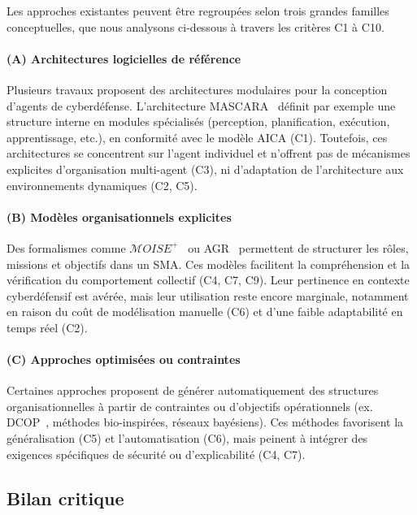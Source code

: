 Les approches existantes peuvent être regroupées selon trois grandes familles conceptuelles, que nous analysons ci-dessous à travers les critères C1 à C10.

\paragraph{(A) Architectures logicielles de référence}

Plusieurs travaux proposent des architectures modulaires pour la conception d'agents de cyberdéfense. L'architecture \ac{MASCARA}~\cite{Kott2023} définit par exemple une structure interne en modules spécialisés (perception, planification, exécution, apprentissage, etc.), en conformité avec le modèle \ac{AICA} (C1). Toutefois, ces architectures se concentrent sur l'agent individuel et n'offrent pas de mécanismes explicites d'organisation multi-agent (C3), ni d'adaptation de l'architecture aux environnements dynamiques (C2, C5).

\paragraph{(B) Modèles organisationnels explicites}

Des formalismes comme $\mathcal{M}OISE^+$~\cite{hubner2002moise} ou \ac{AGR}~\cite{Ferber2004} permettent de structurer les rôles, missions et objectifs dans un \ac{SMA}. Ces modèles facilitent la compréhension et la vérification du comportement collectif (C4, C7, C9). Leur pertinence en contexte cyberdéfensif est avérée, mais leur utilisation reste encore marginale, notamment en raison du coût de modélisation manuelle (C6) et d'une faible adaptabilité en temps réel (C2).

\paragraph{(C) Approches optimisées ou contraintes}

Certaines approches proposent de générer automatiquement des structures organisationnelles à partir de contraintes ou d'objectifs opérationnels (ex. \ac{DCOP}~\cite{modi2005adopt}, méthodes bio-inspirées, réseaux bayésiens). Ces méthodes favorisent la généralisation (C5) et l'automatisation (C6), mais peinent à intégrer des exigences spécifiques de sécurité ou d'explicabilité (C4, C7).

\subsection*{Bilan critique}

